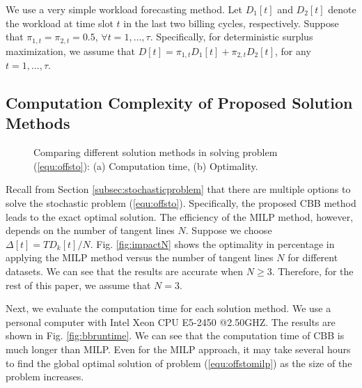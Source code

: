 \documentclass[10pt,journal,compsoc]{IEEEtran}
\begin{document}
We use a very simple workload forecasting method. Let $D_1[t]$ and $D_2[t]$ denote the workload at time slot $t$ in the last two billing cycles, respectively. Suppose that $\pi_{1,t} = \pi_{2,t} = 0.5$, $\forall t = 1,\ldots,\tau$. Specifically, for deterministic surplus maximization, we assume that $D[t]=\pi_{1,t}D_1[t]+\pi_{2,t}D_2[t]$, for any $t = 1,\ldots,\tau$. 





\subsection{Computation Complexity of Proposed Solution Methods}\label{subsec:impacttengentslines}
\begin{figure}[!t]
\centering
{}
\caption{Comparing different solution methods in solving problem (\ref{equ:offsto}): (a) Computation time, (b) Optimality.}\vspace{-0.35cm}\label{fig:near}
\end{figure}

Recall from Section \ref{subsec:stochasticproblem} that there are multiple options to solve the stochastic problem (\ref{equ:offsto}). Specifically, the proposed CBB method leads to the exact optimal solution. The efficiency of the MILP method, however, depends on the number of tangent lines $N$. Suppose we choose $\Delta[t]=TD_k[t]/N$. Fig. \ref{fig:impactN} shows the optimality in percentage in applying the MILP method versus the number of tangent lines $N$ for different datasets. We can see that the results are accurate when $N\geq 3$. Therefore, for the rest of this paper, we assume that $N=3$.











Next, we evaluate the computation time for each solution method. We use a personal computer with Intel Xeon CPU E5-2450 @2.50GHZ. The results are shown in Fig. \ref{fig:bbruntime}. We can see that the computation time of CBB is much longer than MILP. Even for the MILP approach, it may take several hours to find the global optimal solution of problem (\ref{equ:offstomilp}) as the size of the problem increases.
\end{document}
